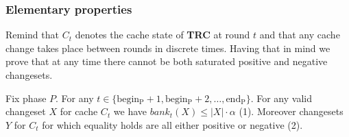 \subsubsection{Elementary properties}
Remind that $C_t$ denotes the cache state of \textbf{TRC} at round $t$ and that 
any cache change takes place between rounds in discrete times. 
Having that in mind we prove that at any time there cannot be both saturated 
positive and negative changesets.
\begin{lemma}
\label{thm:lemma1}
Fix phase $P$. For any $t \in \{\mathrm{begin_P} +1, \mathrm{begin_P} + 2, 
\ldots, \mathrm{end_P}\}$. 
For any valid changeset $X$ for cache $C_t$ we have $bank_t(X) \leq |X| \cdot 
\alpha$ (1). Moreover changesets $Y$ for $C_t$ for which equality holds are 
all either positive or negative (2).
\end{lemma}

